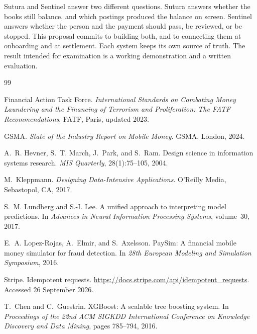 \documentclass[12pt,a4paper]{article}
\begin{document}
Sutura and Sentinel answer two different questions. Sutura answers whether the books still balance, and which postings produced the balance on screen. Sentinel answers whether the person and the payment should pass, be reviewed, or be stopped. This proposal commits to building both, and to connecting them at onboarding and at settlement. Each system keeps its own source of truth. The result intended for examination is a working demonstration and a written evaluation.

\begin{thebibliography}{99}

Financial Action Task Force.
\newblock \emph{International Standards on Combating Money Laundering and the Financing of Terrorism and Proliferation: The FATF Recommendations}.
\newblock FATF, Paris, updated 2023.

GSMA.
\newblock \emph{State of the Industry Report on Mobile Money}.
\newblock GSMA, London, 2024.

A.~R. Hevner, S.~T. March, J.~Park, and S.~Ram.
\newblock Design science in information systems research.
\newblock \emph{MIS Quarterly}, 28(1):75--105, 2004.

M.~Kleppmann.
\newblock \emph{Designing Data-Intensive Applications}.
\newblock O'Reilly Media, Sebastopol, CA, 2017.

S.~M. Lundberg and S.-I. Lee.
\newblock A unified approach to interpreting model predictions.
\newblock In \emph{Advances in Neural Information Processing Systems}, volume~30, 2017.

E.~A. Lopez-Rojas, A.~Elmir, and S.~Axelsson.
\newblock PaySim: A financial mobile money simulator for fraud detection.
\newblock In \emph{28th European Modeling and Simulation Symposium}, 2016.

Stripe.
\newblock Idempotent requests.
\newblock \url{https://docs.stripe.com/api/idempotent_requests}.
\newblock Accessed 26 September 2026.

T.~Chen and C.~Guestrin.
\newblock XGBoost: A scalable tree boosting system.
\newblock In \emph{Proceedings of the 22nd ACM SIGKDD International Conference on Knowledge Discovery and Data Mining}, pages 785--794, 2016.

\end{thebibliography}
\end{document}
